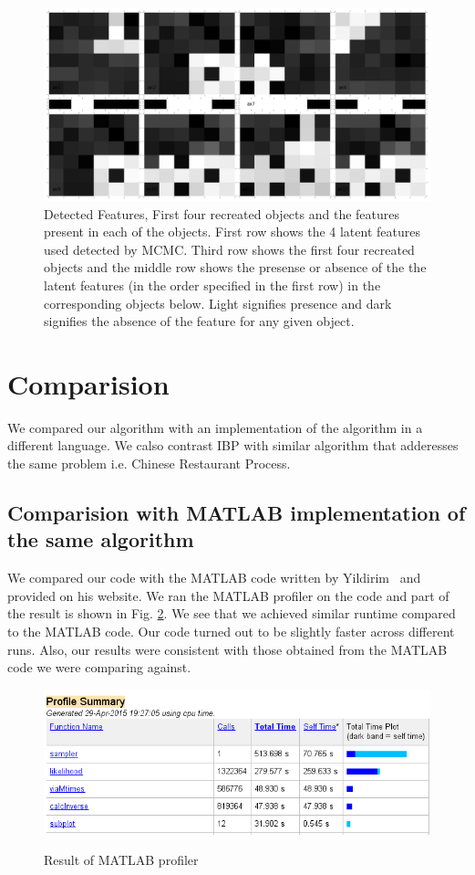 \documentclass{article}
\begin{document}
\begin{figure}
\includegraphics[width=\linewidth]{figures/Detected.png}
\caption {Detected Features, First four recreated objects and the features present in each of the objects. First row shows the 4 latent features used detected by MCMC. Third row shows the first four recreated objects and the middle row shows the presense or absence of the the latent features (in the order specified in the first row) in the corresponding objects below. Light signifies presence and dark signifies the absence of the feature for any given object.}
\label{fig:detected}
\end{figure}

\section{Comparision}
We compared our algorithm with an implementation of the algorithm in a different language. We calso contrast IBP with similar algorithm that adderesses the same problem i.e. Chinese Restaurant Process.
\subsection{Comparision with MATLAB implementation of the same algorithm}
We compared our code with the MATLAB code written by Yildirim~\cite{yildirimweb} and provided on his website. We ran the MATLAB profiler on the code and part of the result is shown in Fig. \ref{fig:profilematlab}. We see that we achieved similar runtime compared to the MATLAB code. Our code turned out to be slightly faster across different runs. Also, our results were consistent with those obtained from the MATLAB code we were comparing against.
\begin{figure}
\caption{Result of MATLAB profiler}
\includegraphics[width=\linewidth]{MatlabProfile.PNG}
\label{fig:profilematlab}
\end{figure}
\end{document}
